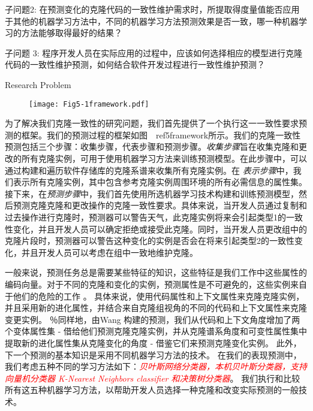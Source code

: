 子问题2: 在预测变化的克隆代码的一致性维护需求时，所提取得度量值能否应用于其他的机器学习方法中，不同的机器学习方法预测效果是否一致，哪一种机器学习的方法能够取得最好的结果？

子问题 3: 程序开发人员在实际应用的过程中，应该如何选择相应的模型进行克隆代码的一致性维护预测，如何结合软件开发过程进行一致性维护预测？

{Research Problem}


\begin{figure}[htbp]
\centering
\texttt{[image: Fig5-1framework.pdf]}
\vspace{-1em}
\end{figure}

为了解决我们克隆一致性的研究问题，我们首先提供了一个执行这一一致性要求预测的框架。我们的预测过程的框架如图~\ ref{5framework}所示。我们的克隆一致性预测包括三个步骤：收集步骤，代表步骤和预测步骤。{\em 收集步骤\/}旨在收集克隆和更改的所有克隆实例，可用于使用机器学习方法来训练预测模型。在此步骤中，可以通过构建和遍历软件存储库的克隆系谱来收集所有克隆实例。在\emph{ 表示步骤\/}中，我们表示所有克隆实例，其中包含参考克隆实例周围环境的所有必需信息的属性集。接下来，在{\em 预测步骤\/}中，我们首先使用所选机器学习技术构建和训练预测模型，然后预测克隆克隆和更改操作的克隆一致性要求。具体来说，当开发人员通过复制和过去操作进行克隆时，预测器可以警告天气，此克隆实例将来会引起类型1的一致性变化，并且开发人员可以确定拒绝或接受此克隆。同时，当开发人员更改组中的克隆片段时，预测器可以警告这种变化的实例是否会在将来引起类型2的一致性变化，并且开发人员可以考虑在组中一致地维护克隆。

一般来说，预测任务总是需要某些特征的知识，这些特征是我们工作中这些属性的编码向量。对于不同的克隆和变化的实例，预测属性是不可避免的，这些实例来自于他们的危险的工作\cite{wang2014predicting} \cite{zhang2016predicting}。
具体来说，使用代码属性和上下文属性来克隆克隆实例，并且采用新的进化属性，并结合来自克隆组视角的不同的代码和上下文属性来克隆变更实例。
％同样地，由Wang 构建的预测，我们从代码和上下文角度增加了两个变体属性集 - 借给他们预测克隆克隆实例，并从克隆谱系角度和可变性属性集中提取新的进化属性集从克隆变化的角度 - 借鉴它们来预测克隆变化实例。
此外，下一个预测的基本知识是采用不同机器学习方法的技术。
在我们的表现预测中，我们考虑五种不同的学习方法如下：\textcolor{red}{\em 贝叶斯网络分类器\cite{friedman1997bayesian}，本机贝叶斯分类器\cite{john1995estimating}，支持向量机分类器\cite{platt199912} K-Nearest Neighbors classifier \cite{aha1991instance}和决策树分类器\cite{quinlan2014c4}}。
我们执行和比较所有这五种机器学习方法，以帮助开发人员选择一种克隆和改变实际预测的一般技术。

